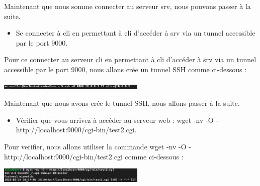 \documentclass[12pt]{article}
\begin{document}
\vspace{0.3cm}

Maintenant que nous somme connecter au serveur srv, nous pouvons passer à la suite.

\vspace{0.3cm}

\begin{itemize}
  \item Se connecter à cli en permettant à cli d’accéder à srv via un tunnel accessible par le port 9000.
\end{itemize}

\vspace{0.3cm}

Pour ce connecter au serveur cli en permettant à cli d’accéder à srv via un tunnel accessible par le port 9000, nous allons crée un tunnel SSH comme ci-dessous : 

\vspace{0.3cm}

\begin{center}
  \includegraphics[width=7cm]{Image-TD-SSH-6/tunnel-ssh.png}
\end{center}

\vspace{0.3cm}

Maintenant que nous avons crée le tunnel SSH, nous allons passer à la suite. 

\vspace{0.3cm}

\begin{itemize}
  \item Vérifier que vous arrivez à accéder au serveur web : wget -nv -O - http://localhost:9000/cgi-bin/test2.cgi.
\end{itemize}

\vspace{0.3cm}

Pour verifier, nous allons utiliser la commande wget -nv -O - http://localhost:9000/cgi-bin/test2.cgi comme ci-dessous : 

\vspace{0.3cm}

\begin{center}
  \includegraphics[width=7cm]{Image-TD-SSH-6/commande-wget.png}
\end{center}
\end{document}
